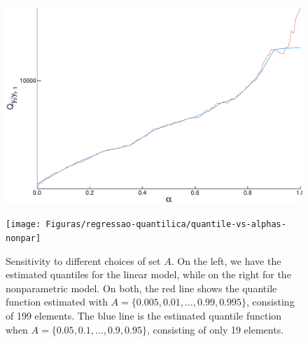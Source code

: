 \begin{figure}
	\centering
	\begin{minipage}[t]{\linewidth}
		\centering
		\begin{minipage}[t]{0.45\linewidth}
			\centering     \includegraphics[width=\textwidth]{Figuras/regressao-quantilica/quantile-vs-alphas-linear}
		\end{minipage}
		\begin{minipage}[t]{0.45\linewidth}
			\centering     \texttt{[image: Figuras/regressao-quantilica/quantile-vs-alphas-nonpar]}
		\end{minipage}
	\end{minipage}
	\caption{Sensitivity to different choices of set $A$. On the left, we have the estimated quantiles for the linear model, while on the right for the nonparametric model. On both, the red line shows the quantile function estimated with $A=\{0.005, 0.01, \dots, 0.99, 0.995 \}$, consisting of 199 elements. The blue line is the estimated quantile function when $A=\{0.05, 0.1, \dots, 0.9, 0.95 \}$, consisting of only 19 elements.}
	\label{fig:quantiles-vs-xt}
\end{figure}